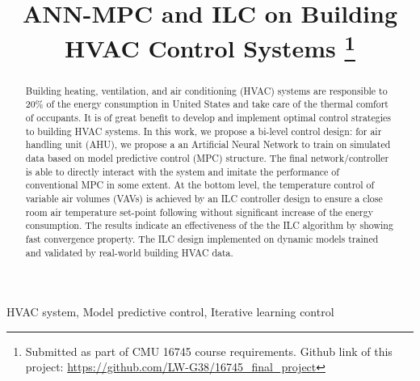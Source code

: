 \documentclass[conference]{IEEEtran}
\begin{document}
\title{ANN-MPC and ILC on Building HVAC Control Systems
\thanks{Submitted as part of CMU 16745 course requirements. Github link of this project: \url{https://github.com/LW-G38/16745_final_project}}
}

\author{
\and
{}
}

\maketitle

\begin{abstract}
Building heating, ventilation, and air conditioning (HVAC) systems are responsible to 20\% of the energy consumption in United States and take care of the thermal comfort of occupants.  It is of great benefit to develop and implement optimal control strategies to building HVAC systems. In this work, we propose a bi-level control design: for air handling unit (AHU), we propose a an Artificial Neural Network to train on simulated data based on model predictive control (MPC) structure. The final network/controller is able to directly interact with the system and imitate the performance of conventional MPC in some extent. At the bottom level, the temperature control of variable air volumes (VAVs) is achieved by an ILC controller design to ensure a close room air temperature set-point following without significant increase of the energy consumption. The results indicate an effectiveness of the the ILC algorithm by showing fast convergence property. The ILC design implemented on dynamic models trained and validated by real-world building HVAC data.
\end{abstract}

\begin{IEEEkeywords}
HVAC system, Model predictive control, Iterative learning control
\end{IEEEkeywords}
\end{document}
